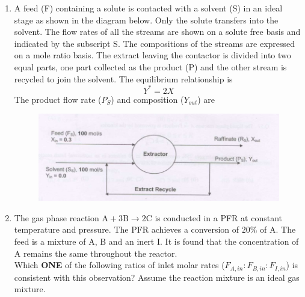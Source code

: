 \documentclass[journal,12pt,onecolumn]{IEEEtran}
\theoremstyle{remark}
\begin{document}
\begin{enumerate}
\item A feed (F) containing a solute is contacted with a solvent (S) in an ideal stage as shown in the diagram below. Only the solute transfers into the solvent. The flow rates of all the streams are shown on a solute free basis and indicated by the subscript S. The compositions of the streams are expressed on a mole ratio basis. The extract leaving the contactor is divided into two equal parts, one part collected as the product (P) and the other stream is recycled to join the solvent. The equilibrium relationship is
\[Y^* = 2X\]
The product flow rate ($P_S$) and composition ($Y_{out}$) are
\begin{figure}[H]
    \centering
    \includegraphics[width=0.25\columnwidth]{figs/qn54.jpg}
    \caption{}
    \label{fig:qn54.jpg}
\end{figure}
\hfill{}
\begin{enumerate}
\end{enumerate}

\item The gas phase reaction $\mathrm{A + 3B \rightarrow 2C}$ is conducted in a PFR at constant temperature and pressure. The PFR achieves a conversion of $20\%$ of A. The feed is a mixture of A, B and an inert I. It is found that the concentration of A remains the same throughout the reactor. \\
Which \textbf{ONE} of the following ratios of inlet molar rates ($F_{A,in}: F_{B,in}: F_{I,in}$) is consistent with this observation? Assume the reaction mixture is an ideal gas mixture.
\hfill{}
\begin{enumerate}
\end{enumerate}


\end{enumerate}
\end{document}
